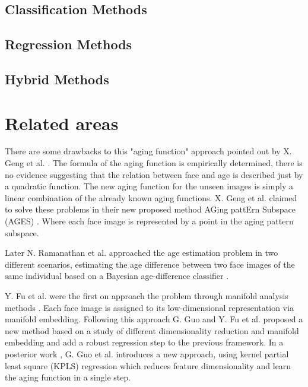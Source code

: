 \subsection{Classification Methods}
\subsection{Regression Methods}
\subsection{Hybrid Methods}

\section{Related areas}



There are some drawbacks to this "aging function" approach pointed out by X. Geng et al. \cite{Geng:2006:LFA:1180639.1180711}. The formula of the aging function is empirically determined, there is no evidence suggesting that the relation between face and age is described just by a quadratic function. The new aging function for the unseen images is simply a linear combination of the already known aging functions. X. Geng et al. claimed to solve these problems in their new proposed method AGing pattErn Subspace (AGES) \cite{Geng:2006:LFA:1180639.1180711}. Where each face image is represented by a point in the aging pattern subspace.

Later N. Ramanathan et al. \cite{1709980, 1640784} approached the age estimation problem in two different scenarios, estimating the age difference between two face images of the same individual based on a Bayesian age-difference classifier \cite{1709980}.

Y. Fu et al. were the first on approach the problem through manifold analysis methods \cite{4284917, 4523958}. Each face image is assigned to its low-dimensional representation via manifold embedding. Following this approach G. Guo and Y. Fu et al. \cite{4531189} proposed a new method based on a study of different dimensionality reduction and manifold embedding and add a robust regression step to the previous framework. In a posterior work \cite{5995404}, G. Guo et al. introduces a new approach, using kernel partial least square (KPLS) regression which reduces feature dimensionality and learn the aging function in a single step.

